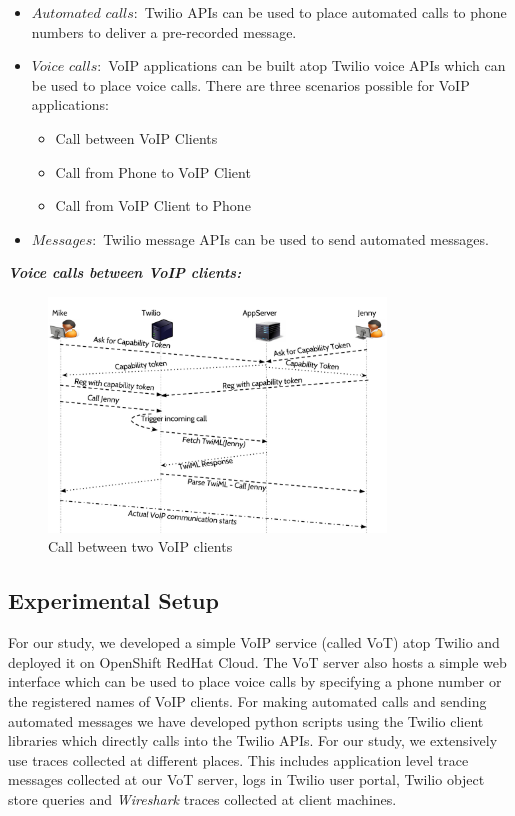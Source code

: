 \begin{itemize}
\item $Automated$ $calls: $ Twilio APIs can be used to place automated calls to phone numbers to deliver a pre-recorded message.
\item $Voice$ $calls: $ VoIP applications can be built atop Twilio voice APIs which can be used to place voice calls. There are three scenarios possible for VoIP applications:  
\begin{itemize}
\item Call between VoIP Clients
\item Call from Phone to VoIP Client
\item Call from VoIP Client to Phone
\end{itemize}
\item $Messages: $ Twilio message APIs can be used to send automated messages.
\end{itemize}
\emph{\textbf{Voice calls between VoIP clients:} }
\begin{figure}[t!] 
\centering
  \includegraphics[width=0.8\textwidth]{figs/twoclients.pdf}
\caption{Call between two VoIP clients}
\label{fig:2VoIPcall}
\end{figure}
\subsection{Experimental Setup}

For our study, we developed a simple VoIP service (called VoT) atop Twilio and deployed it on OpenShift RedHat Cloud. The VoT server also hosts a simple web interface which can be used to place voice calls by specifying a phone number or the registered names of VoIP clients. For making automated calls and sending automated messages we have developed python scripts using the Twilio client libraries which directly calls into the Twilio APIs. For our study, we extensively use traces collected at different places. This includes application level trace messages collected at our VoT server, logs in Twilio user portal, Twilio object store queries and \textit{Wireshark} traces collected at client machines.

